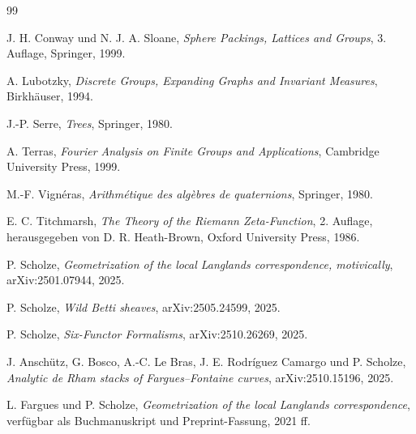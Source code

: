 \documentclass[12pt,a4paper]{article}
\theoremstyle{plain}
\theoremstyle{definition}
\theoremstyle{remark}
\begin{document}
\begin{thebibliography}{99}

J. H. Conway und N. J. A. Sloane,
\emph{Sphere Packings, Lattices and Groups},
3. Auflage, Springer, 1999.

A. Lubotzky,
\emph{Discrete Groups, Expanding Graphs and Invariant Measures},
Birkhäuser, 1994.

J.-P. Serre,
\emph{Trees},
Springer, 1980.

A. Terras,
\emph{Fourier Analysis on Finite Groups and Applications},
Cambridge University Press, 1999.

M.-F. Vignéras,
\emph{Arithmétique des algèbres de quaternions},
Springer, 1980.

E. C. Titchmarsh,
\emph{The Theory of the Riemann Zeta-Function},
2. Auflage, herausgegeben von D. R. Heath-Brown, Oxford University Press, 1986.

P. Scholze,
\emph{Geometrization of the local Langlands correspondence, motivically},
arXiv:2501.07944, 2025.

P. Scholze,
\emph{Wild Betti sheaves},
arXiv:2505.24599, 2025.

P. Scholze,
\emph{Six-Functor Formalisms},
arXiv:2510.26269, 2025.

J. Anschütz, G. Bosco, A.-C. Le Bras, J. E. Rodríguez Camargo und P. Scholze,
\emph{Analytic de Rham stacks of Fargues--Fontaine curves},
arXiv:2510.15196, 2025.

L. Fargues und P. Scholze,
\emph{Geometrization of the local Langlands correspondence},
verfügbar als Buchmanuskript und Preprint-Fassung, 2021 ff.

\end{thebibliography}
\end{document}

